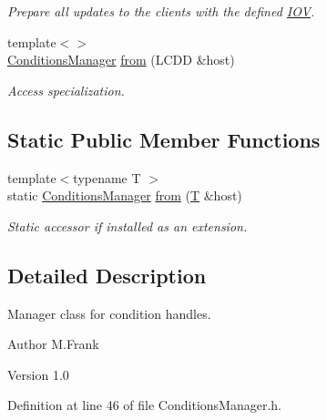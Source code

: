 \begin{DoxyCompactItemize}
\begin{DoxyCompactList}\small\item\em Prepare all updates to the clients with the defined \hyperlink{class_d_d4hep_1_1_i_o_v}{IOV}. \item\end{DoxyCompactList}\item 
{\footnotesize template$<$$>$ }\\\hyperlink{class_d_d4hep_1_1_conditions_1_1_conditions_manager}{ConditionsManager} \hyperlink{class_d_d4hep_1_1_conditions_1_1_conditions_manager_aa6ab9b41e81f93dea9ce024ace8b91b8}{from} (LCDD \&host)
\begin{DoxyCompactList}\small\item\em Access specialization. \item\end{DoxyCompactList}\end{DoxyCompactItemize}
\subsection*{Static Public Member Functions}
\begin{DoxyCompactItemize}
\item 
{\footnotesize template$<$typename T $>$ }\\static \hyperlink{class_d_d4hep_1_1_conditions_1_1_conditions_manager}{ConditionsManager} \hyperlink{class_d_d4hep_1_1_conditions_1_1_conditions_manager_a6b5f292957b59a38ec35d29c02dd657e}{from} (\hyperlink{class_t}{T} \&host)
\begin{DoxyCompactList}\small\item\em Static accessor if installed as an extension. \item\end{DoxyCompactList}\end{DoxyCompactItemize}


\subsection{Detailed Description}
Manager class for condition handles. \begin{DoxyAuthor}{Author}
M.Frank 
\end{DoxyAuthor}
\begin{DoxyVersion}{Version}
1.0 
\end{DoxyVersion}


Definition at line 46 of file ConditionsManager.h.

